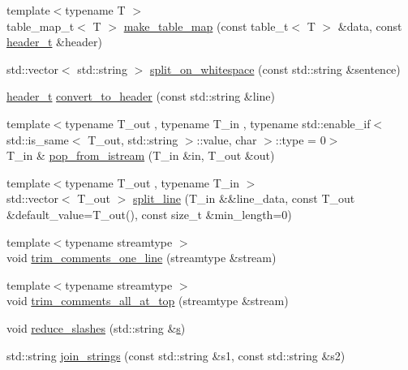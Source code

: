 \begin{DoxyCompactItemize}
\item 
{\footnotesize template$<$typename T $>$ }\\table\-\_\-map\-\_\-t$<$ T $>$ \hyperlink{namespaceIceBRG_a8b16d77487fb029cea7629dc52bd7dc7}{make\-\_\-table\-\_\-map} (const table\-\_\-t$<$ T $>$ \&data, const \hyperlink{namespaceIceBRG_a49e8b48f1dbd351e9748e7cbe80705df}{header\-\_\-t} \&header)
\item 
std\-::vector$<$ std\-::string $>$ \hyperlink{namespaceIceBRG_aad40379211c58b53606d4bdb8bf7e4aa}{split\-\_\-on\-\_\-whitespace} (const std\-::string \&sentence)
\item 
\hyperlink{namespaceIceBRG_a49e8b48f1dbd351e9748e7cbe80705df}{header\-\_\-t} \hyperlink{namespaceIceBRG_a9f5dc0a1a78255329f619200e7dca2ac}{convert\-\_\-to\-\_\-header} (const std\-::string \&line)
\item 
{\footnotesize template$<$typename T\-\_\-out , typename T\-\_\-in , typename std\-::enable\-\_\-if$<$ std\-::is\-\_\-same$<$ T\-\_\-out, std\-::string $>$\-::value, char $>$\-::type  = 0$>$ }\\T\-\_\-in \& \hyperlink{namespaceIceBRG_a1ff20754fdcf67b62d9d29e53769f22f}{pop\-\_\-from\-\_\-istream} (T\-\_\-in \&in, T\-\_\-out \&out)
\item 
{\footnotesize template$<$typename T\-\_\-out , typename T\-\_\-in $>$ }\\std\-::vector$<$ T\-\_\-out $>$ \hyperlink{namespaceIceBRG_a7468ea3f83d5b2502eb12fd7894e4b59}{split\-\_\-line} (T\-\_\-in \&\&line\-\_\-data, const T\-\_\-out \&default\-\_\-value=T\-\_\-out(), const size\-\_\-t \&min\-\_\-length=0)
\item 
{\footnotesize template$<$typename streamtype $>$ }\\void \hyperlink{namespaceIceBRG_a349cf2523982e3a7dbbf85a19f7b2961}{trim\-\_\-comments\-\_\-one\-\_\-line} (streamtype \&stream)
\item 
{\footnotesize template$<$typename streamtype $>$ }\\void \hyperlink{namespaceIceBRG_acd00ce9e6eda20948b9394a63ef2f3c7}{trim\-\_\-comments\-\_\-all\-\_\-at\-\_\-top} (streamtype \&stream)
\item 
void \hyperlink{namespaceIceBRG_ae8113add7cad89108e48028787a7a41e}{reduce\-\_\-slashes} (std\-::string \&\hyperlink{namespaceIceBRG_ad0b9ada1ad5ccc9d88c2050483109e06}{s})
\item 
std\-::string \hyperlink{namespaceIceBRG_a4669723c2cfad096fab4c4dcac0e0db3}{join\-\_\-strings} (const std\-::string \&s1, const std\-::string \&s2)

\end{DoxyCompactItemize}

